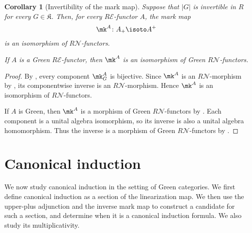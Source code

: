 \documentclass{amsart}
\numberwithin{equation}{section}%
\newtheorem{Cor}[equation]{Corollary}
\theoremstyle{remark}
\theoremstyle{definition}
\newcommand{\e}{\mathcal E}
\newcommand{\n}{\mathcal N}
\begin{document}
%
\begin{Cor}[Invertibility of the mark map]
\label{cor:mark-isomorphism}
Suppose that $|G|$ is invertible in $R$ for every
$G\in\mathfrak K$.
Then, for every $R\e$-functor $A$, the mark map
%
\[
\mk^A\colon A_+\isoto A^+
\]
%
is an isomorphism of $R\n$-functors.

If $A$ is a Green $R\e$-functor, then $\mk^A$ is an
isomorphism of Green $R\n$-functors.
\end{Cor}
%
\begin{proof}
By , every component
$\mk_G^A$ is bijective.
Since $\mk^A$ is an $R\n$-morphism by
, its componentwise inverse is
an $R\n$-morphism.
Hence $\mk^A$ is an isomorphism of $R\n$-functors.

If $A$ is Green, then $\mk^A$ is a morphism of Green
$R\n$-functors by .
Each component is a unital algebra isomorphism, so its inverse
is also a unital algebra homomorphism.
Thus the inverse is a morphism of Green $R\n$-functors by
.
\end{proof}




%
\section{Canonical induction}
\label{sec:canonical-induction}
%
We now study canonical induction in the setting of Green
categories. We first define canonical induction as a section
of the linearization map. We then use the upper-plus adjunction
and the inverse mark map to construct a candidate for such a
section, and determine when it is a canonical induction formula.
We also study its multiplicativity.
%
\end{document}
